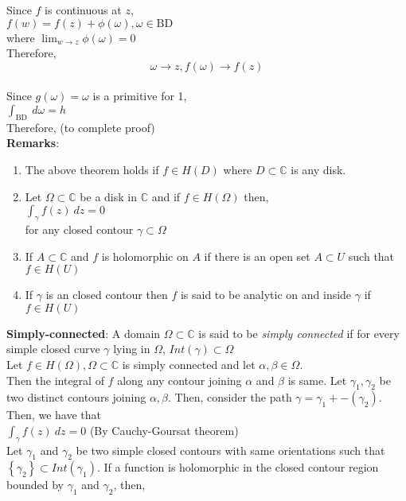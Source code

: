 \documentclass{article}
\begin{document}
\begin{flushleft}
\begin{center}
\begin{tikzpicture}[x=0.75pt,y=0.75pt,yscale=-1,xscale=1]
\end{tikzpicture}
	


\end{center}

Since $f$ is continuous at $z$, \\
	$f\left( w \right)  = f\left( z \right)  + \phi\left( \omega \right), \omega \in \text{BD}$\\
where $\lim_{w \to z} \phi(\omega) = 0$\\
Therefore, $$\omega \to z, f(\omega) \to  f \left( z \right) $$ \\

Since $g\left( \omega \right) = \omega$ is a primitive for 1,\\
$\int_{{\text{BD}}}^{{}} {} \: d{\omega} {} = h$\\
Therefore, (to complete proof)\\
\textbf{Remarks}:
\begin{enumerate}
\item The above theorem holds if $f \in  H\left( D \right) $ where $D \subset \mathds{C}$ is any disk. 
\item Let $\Omega \subset \mathds{C}$ be a disk in $\mathds{C}$ and if $f \in H\left( \Omega \right) $ then, \\
	$\int_{{\gamma}}^{{}} {f\left( z \right) } \: d{z} {} = 0$\\
	for any closed contour $\gamma \subset \Omega$
\item If $A \subset \mathds{C}$ and $f$ is holomorphic on $A $ if there is an open set $A \subset U$ such that $f \in  H \left( U \right) $ \\
\item If $\gamma$ is an closed contour then $f $ is said to be analytic on and inside $\gamma$ if $f \in H\left( U \right) $
\end{enumerate}
\textbf{Simply-connected}: A domain $\Omega \subset \mathds{C}$ is said to be \emph{simply connected} if for every simple closed curve $\gamma$ lying in $\Omega$,   $Int\left( \gamma \right) \subset \Omega$\\
\vspace{3mm}
Let $f \in H\left( \Omega \right) , \Omega \subset \mathds{C}$ is simply connected and let $\alpha, \beta \in  \Omega$.\\
Then the integral of $f$ along any contour joining $\alpha$	and $\beta$ is same.  
Let $\gamma_1, \gamma_2$ be two distinct contours joining $\alpha, \beta$. Then, consider the path $\gamma = \gamma_1 + -\left( \gamma_2 \right) $. Then, we have that \\
$\int_{{\gamma}}^{{}} {f\left( z \right) } \: d{z} {} = 0$ (By Cauchy-Goursat theorem)\\
\vspace{2mm}
Let $\gamma_1$ and $\gamma_2$ be two simple closed contours with same orientations such that $\left\{ \gamma_2 \right\} \subset Int\left( \gamma_1 \right) $. If a function is holomorphic in the closed contour region bounded by $\gamma_1$ and $\gamma_2$, then, 


\end{flushleft}
\end{document}
